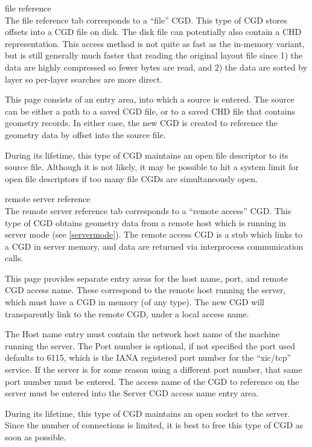\begin{description}
\item{\cb file reference}\\
The {\cb file reference} tab corresponds to a ``file'' CGD.  This type
of CGD stores offsets into a CGD file on disk.  The disk file can
potentially also contain a CHD representation.  This access method is
not quite as fast as the in-memory variant, but is still generally
much faster that reading the original layout file since 1) the data
are highly compressed so fewer bytes are read, and 2) the data are
sorted by layer so per-layer searches are more direct.

This page consists of an entry area, into which a source is entered. 
The source can be either a path to a saved CGD file, or to a saved CHD
file that contains geometry records.  In either case, the new CGD is
created to reference the geometry data by offset into the source file.

During its lifetime, this type of CGD maintains an open file
descriptor to its source file.  Although it is not likely, it may be
possible to hit a system limit for open file descriptors if too many
file CGDs are simultaneously open.

\item{\cb remote server reference}\\
The {\cb remote server reference} tab corresponds to a ``remote
access'' CGD.  This type of CGD obtains geometry data from a remote
host which is running {\Xic} in server mode (see \ref{servermode}). 
The remote access CGD is a stub which links to a CGD in server memory,
and data are returned via interprocess communication calls.

This page provides separate entry areas for the host name, port, and
remote CGD access name.  These correspond to the remote host running
the {\Xic} server, which must have a CGD in memory (of any type).  The
new CGD will transparently link to the remote CGD, under a local
access name.

The {\cb Host name} entry must contain the network host name of the
machine running the server.  The {\cb Port number} is optional, if not
specified the port used defaults to 6115, which is the IANA registered
port number for the ``{\vt xic/tcp}'' service.  If the server is for
some reason using a different port number, that same port number must
be entered.  The access name of the CGD to reference on the server
must be entered into the {\cb Server CGD access name} entry area.

During its lifetime, this type of CGD maintains an open socket to the
server.  Since the number of connections is limited, it is best to
free this type of CGD as soon as possible.
\end{description}

